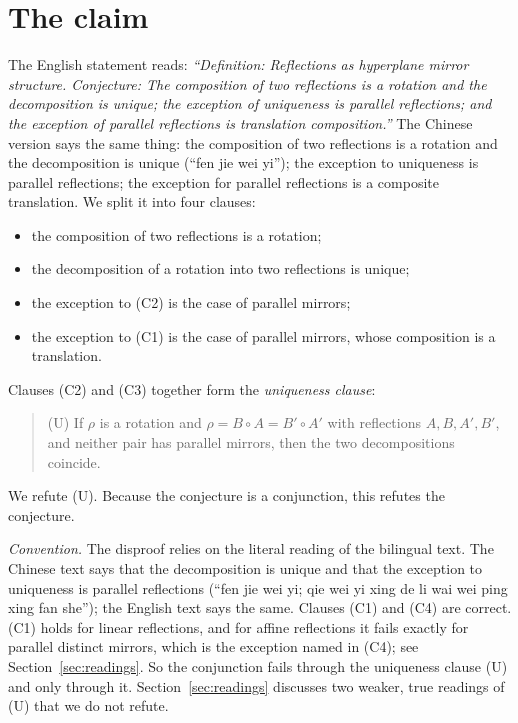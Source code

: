 \documentclass[11pt]{article}
\theoremstyle{definition}
\theoremstyle{remark}
\begin{document}
\section{The claim}

The English statement reads: \emph{``Definition: Reflections as hyperplane mirror structure.
Conjecture: The composition of two reflections is a rotation and the decomposition is unique;
the exception of uniqueness is parallel reflections; and the exception of parallel reflections
is translation composition.''} The Chinese version says the same thing: the composition of two
reflections is a rotation and the decomposition is unique (``fen jie wei yi''); the exception
to uniqueness is parallel reflections; the exception for parallel reflections is a composite
translation. We split it into four clauses:
\begin{itemize}
\item[(C1)] the composition of two reflections is a rotation;
\item[(C2)] the decomposition of a rotation into two reflections is unique;
\item[(C3)] the exception to (C2) is the case of parallel mirrors;
\item[(C4)] the exception to (C1) is the case of parallel mirrors, whose composition is a
translation.
\end{itemize}
Clauses (C2) and (C3) together form the \emph{uniqueness clause}:
\begin{quote}
(U) If $\rho$ is a rotation and $\rho=B\circ A=B'\circ A'$ with reflections $A,B,A',B'$, and
neither pair has parallel mirrors, then the two decompositions coincide.
\end{quote}
We refute (U). Because the conjecture is a conjunction, this refutes the conjecture.

\emph{Convention.} The disproof relies on the literal reading of the bilingual text. The
Chinese text says that the decomposition is unique and that the exception to uniqueness is
parallel reflections (``fen jie wei yi; qie wei yi xing de li wai wei ping xing fan she''); the
English text says the same. Clauses (C1) and (C4) are correct. (C1) holds for linear
reflections, and for affine reflections it fails exactly for parallel distinct mirrors, which
is the exception named in (C4); see Section~\ref{sec:readings}. So the conjunction fails
through the uniqueness clause (U) and only through it. Section~\ref{sec:readings} discusses two
weaker, true readings of (U) that we do not refute.
\end{document}
